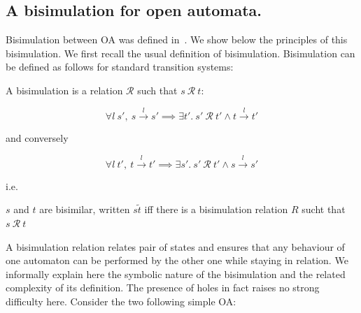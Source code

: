 \documentclass[runningheads]{llncs}
\begin{document}
\subsection{A bisimulation for open automata.}

Bisimulation between OA was defined in~\cite{fhbisim}.  We show below the principles of this bisimulation. We first recall the usual definition of bisimulation.
Bisimulation can  be defined as follows for standard transition systems: 

\begin{definition}
  A bisimulation is a relation $\mathcal{R}$ such that $s~\mathcal{R}~t$:\\
  \begin{minipage}[c]{.6\textwidth}
    \[
      \forall l~s',~ {s}\xrightarrow{l}{s'}
      \implies
      \exists t'.~ s' ~\mathcal{R}~ t'
      \land {t}\xrightarrow{l}{t'}
    \]
    \begin{center}
      and conversely
    \end{center}
    \vspace{-1ex}
    \[
      \forall l~t',~ {t}\xrightarrow{l}{t'}
      \implies
      \exists s'.~ s' ~\mathcal{R}~ t'
      \land {s}\xrightarrow{l}{s'}
    \]
    \vspace{.5ex}
  \end{minipage}
  i.e. \qquad
  \begin{minipage}[c]{.35\textwidth}
  \end{minipage}
$s$ and $t$ are bisimilar, written $s\tilde t$ iff there is a bisimulation relation $R$ sucht that  $s ~\mathcal{R}~ t$
\end{definition}

A  bisimulation relation  relates pair of states and ensures that any behaviour of one automaton can be performed by the other one while staying in relation. We informally explain here the symbolic nature of the bisimulation and the related complexity of its definition. The presence of holes in fact raises no strong difficulty here.
Consider the two following simple OA:
\end{document}

